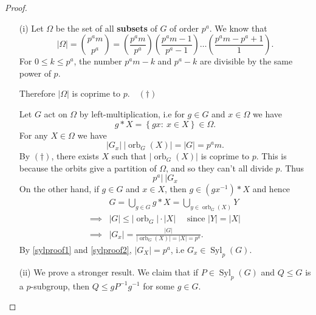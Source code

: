 \documentclass[a4paper]{scrartcl}
\begin{document}
\begin{proof}
      \begin{itemize}
           \item[(i)] Let $\Omega$ be the set of all \textbf{subsets} of $G$ of order $p^{a}$. We know that \[
           |\Omega|= {p^{a}m \choose p^{a}}=\left( \frac{p^{a}m}{p^{a}}\right)\left( \frac{p^{a}m -1}{p^{a}-1}\right)\ldots \left( \frac{p^{a}m- p^{a}+1}{1}\right)
           .\] For $0 \leq k \leq p^{a}$, the number $p^{a}m-k$ and $p^{a}-k$ are divisible by the same power of $p$. 

           Therefore $|\Omega|$ is coprime to $p$.\hfill $\quad (\dagger)$ 

           Let $G$ act on $\Omega$ by left-multiplication, i.e for $g \in G$ and $x \in \Omega$ we have \[
           g \ast X= \left\{gx: \ x \in X\right\} \in \Omega
           .\] For any $X \in \Omega$ we have \[
           |G_{x}|\ |\operatorname{orb}_{G}(X)|=|G|=p^{a}m
           .\] By $(\dagger)$, there exists $X$ such that $|\operatorname{orb}_{G}(X)|$ is coprime to $p$. This is because the orbits give a partition of $\Omega$, and so they can't all divide $p$. Thus
           \begin{equation}\label{sylproof1}
               p^{a} | \ |G_{x}
           \end{equation}
            On the other hand, if $g \in G$ and $x \in X$, then $g \in (g {x}^{-1})\ast X$ and hence
           \begin{align}
               &G = \bigcup_{g \in G} g \ast X=\bigcup_{y \in \operatorname{orb}_{G}(X)} Y \nonumber\\ 
               \implies & |G| \leq |\operatorname{orb}_{G}| \cdot  |X| \quad \text{ since } |Y|=|X| \nonumber\\
               \implies & |G_{x}|= \frac{|G|}{|\operatorname{orb}_{G}(X)|=|X|=p^{a}} \label{sylproof2}.
           \end{align}
           By \ref{sylproof1} and \ref{sylproof2}, $|G_{X}|=p^{a}$, i.e $G_{x} \in \operatorname{Syl}_{p}(G)$.
           \item[(ii)] We prove a stronger result. We claim that if $P \in \operatorname{Syl}_{p}(G)$ and $Q \leq G$ is a $p$-subgroup, then $Q \leq g {P}^{-1} {g}^{-1}$ for some $g \in G$.
           

\end{itemize}
\end{proof}
\end{document}
